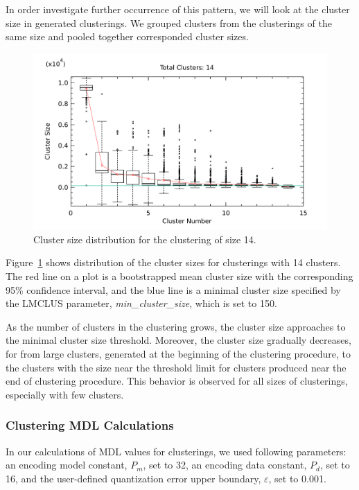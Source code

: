 In order investigate further occurrence of this pattern, we will look at
the cluster size in generated clusterings. We grouped clusters from
the clusterings of the same size and pooled together corresponded cluster sizes.

\begin{figure}[H]
\center
\includegraphics[width=6.0in]{img/mdl-clust_clust-size-14_1.pdf}
\caption{Cluster size distribution for the clustering of size 14.}
\label{fig:clust-size-14}
\end{figure}



Figure~\ref{fig:clust-size-14} shows distribution of the cluster sizes for
clusterings with 14 clusters. The red line on a plot is a bootstrapped mean
cluster size with the corresponding 95\% confidence interval, and the blue line
is a minimal cluster size specified by the LMCLUS parameter,
\emph{min\_cluster\_size}, which is set to 150.

As the number of clusters in the clustering grows, the cluster size  approaches
to the minimal cluster size threshold. Moreover, the cluster size gradually
decreases, for from large clusters, generated at the beginning of
the clustering procedure, to the clusters with the size near the threshold limit
for clusters produced near the end of clustering procedure. This behavior is
observed for all sizes of clusterings, especially with few clusters.


\subsubsection{Clustering MDL Calculations}
\label{sssc:clust-mdl}

In our calculations of MDL values for clusterings, we used following parameters:
an encoding model constant, $P_m$, set to 32, an encoding data constant,
$P_d$, set to 16, and the user-defined quantization error upper boundary,
$\varepsilon$, set to 0.001.




